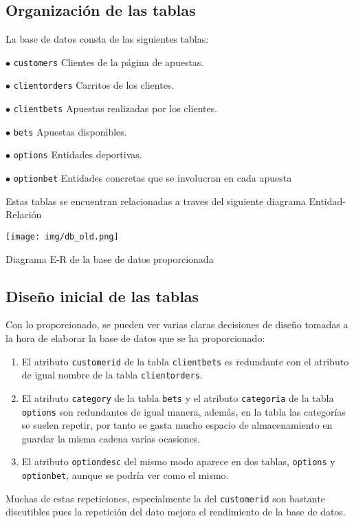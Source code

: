 \documentclass{article}
\begin{document}
\subsection{Organización de las tablas}
La base de datos consta de las siguientes tablas:
\begin{ldescription}
    \item[$\bullet$ \texttt{customers}]
        Clientes de la página de apuestas.
    \item[$\bullet$ \texttt{clientorders}]
        Carritos de los clientes.
    \item[$\bullet$ \texttt{clientbets}]
        Apuestas realizadas por los clientes.
    \item[$\bullet$ \texttt{bets}]
        Apuestas disponibles.
    \item[$\bullet$ \texttt{options}]
        Entidades deportivas.
    \item[$\bullet$ \texttt{optionbet}]
        Entidades concretas que se involucran en cada apuesta
\end{ldescription}
Estas tablas se encuentran relacionadas a traves del siguiente diagrama Entidad-Relación
\smallbreak
\begin{minipage}{\linewidth}
    \centering
    \captionsetup{type=figure}
    \texttt{[image: img/db\_old.png]}
    \caption{Diagrama E-R de la base de datos proporcionada}
    \label{fig:fig1}
\end{minipage}
\subsection{Diseño inicial de las tablas}
Con lo proporcionado, se pueden ver varias claras decisiones de diseño tomadas a la hora de elaborar la base de datos que se ha proporcionado:
\begin{enumerate}
    \item El atributo \texttt{customerid} de la tabla \texttt{clientbets} es redundante con el atributo de igual nombre de la tabla \texttt{clientorders}.
    \item El atributo \texttt{category} de la tabla \texttt{bets} y el atributo \texttt{categoria} de la tabla \texttt{options} son redundantes de igual manera, además, en la tabla las categorías se suelen repetir, por tanto se gasta mucho espacio de almacenamiento en guardar la misma cadena varias ocasiones.
    \item El atributo \texttt{optiondesc} del mismo modo aparece en dos tablas, \texttt{options} y \texttt{optionbet}, aunque se podría ver como el mismo.
\end{enumerate}
Muchas de estas repeticiones, especialmente la del \texttt{customerid} son bastante discutibles pues la repetición del dato mejora el rendimiento de la base de datos.
\end{document}
